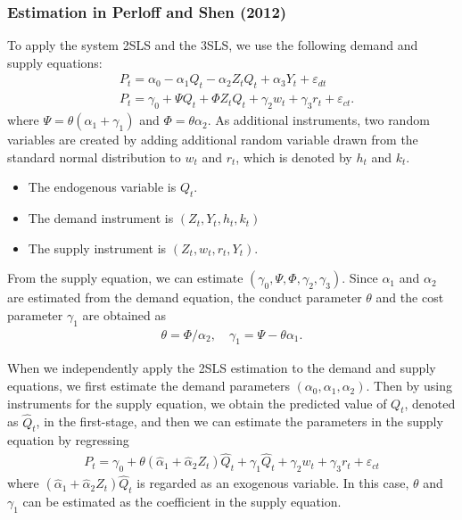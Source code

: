 \documentclass[11pt, a4paper]{article}
\begin{document}
\subsubsection{Estimation in Perloff and Shen (2012)}
To apply the system 2SLS and the 3SLS, we use the following demand and supply equations:
\begin{align*}
    &P_t = \alpha_0 - \alpha_1Q_t - \alpha_2Z_t Q_t + \alpha_3 Y_t + \varepsilon_{dt}\\
    &P_t = \gamma_0 + \Psi Q_t  + \Phi Z_tQ_t  + \gamma_2 w_t + \gamma_3 r_t + \varepsilon_{ct}.
\end{align*}
where $\Psi = \theta(\alpha_1 + \gamma_1)$ and $\Phi = \theta\alpha_2$.
As additional instruments, two random variables are created by adding additional random variable drawn from the standard normal distribution to $w_t$ and $r_t$, which is denoted by $h_t$ and $k_t$. 
\begin{itemize}
    \item The endogenous variable is $Q_t$. 
    \item The demand instrument is $(Z_t, Y_t, h_t, k_t)$
    \item The supply instrument is $(Z_t, w_t, r_t, Y_t)$.
\end{itemize}
From the supply equation, we can estimate $(\gamma_0, \Psi, \Phi, \gamma_2, \gamma_3)$. 
Since $\alpha_1$ and $\alpha_2$ are estimated from the demand equation, the conduct parameter $\theta$ and the cost parameter $\gamma_1$ are obtained as 
\begin{align*}
    \theta = \Phi/\alpha_2, \quad \gamma_1 = \Psi - \theta\alpha_1.
\end{align*}

When we independently apply the 2SLS estimation to the demand and supply equations, we first estimate the demand parameters $(\alpha_0, \alpha_1, \alpha_2)$. Then by using instruments for the supply equation, we obtain the predicted value of $Q_t$, denoted as $\hat{Q}_t$, in the first-stage, and then we can estimate the parameters in the supply equation by regressing
\begin{align*}
     P_t = \gamma_0 + \theta(\hat{\alpha}_1 + \hat{\alpha}_2Z_t)\hat{Q}_t+ \gamma_1\hat{Q}_t  + \gamma_2 w_t + \gamma_3 r_t + \varepsilon_{ct}
\end{align*}
where $(\hat{\alpha}_1 + \hat{\alpha}_2Z_t)\hat{Q}_t$ is regarded as an exogenous variable. In this case, $\theta$ and $\gamma_1$ can be estimated as the coefficient in the supply equation.
\end{document}
